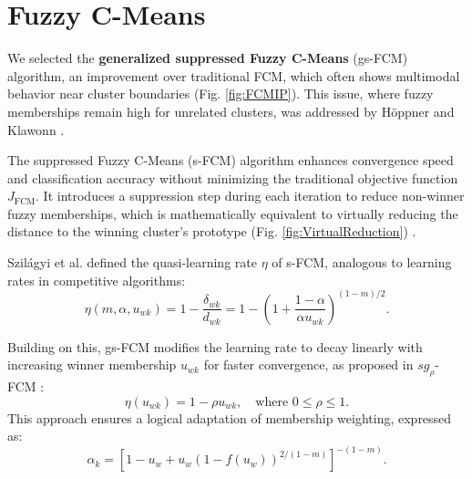 
\section{Fuzzy C-Means}

We selected the \textbf{generalized suppressed Fuzzy C-Means} (gs-FCM) algorithm, an improvement over traditional FCM, which often shows multimodal behavior near cluster boundaries (Fig. \ref{fig:FCMIP}). This issue, where fuzzy memberships remain high for unrelated clusters, was addressed by Höppner and Klawonn \cite{Hoppner2003}.

The suppressed Fuzzy C-Means (s-FCM) algorithm \cite{Fan2003} enhances convergence speed and classification accuracy without minimizing the traditional objective function \( J_{\text{FCM}} \). It introduces a suppression step during each iteration to reduce non-winner fuzzy memberships, which is mathematically equivalent to virtually reducing the distance to the winning cluster's prototype (Fig. \ref{fig:VirtualReduction}) \cite{Szilagyi2010}.

Szilágyi et al. \cite{Szilagyi2010} defined the quasi-learning rate \(\eta\) of s-FCM, analogous to learning rates in competitive algorithms:
\[
\eta(m, \alpha, u_{wk}) = 1 - \frac{\delta_{wk}}{d_{wk}} = 1 - \left( 1 + \frac{1-\alpha}{\alpha u_{wk}} \right)^{(1-m)/2}.
\]

Building on this, gs-FCM modifies the learning rate to decay linearly with increasing winner membership \(u_{wk}\) for faster convergence, as proposed in $sg_\rho$-FCM \cite{Szilagyi2014}:
\[
\eta(u_{wk}) = 1 - \rho u_{wk}, \quad \text{where } 0 \leq \rho \leq 1.
\]
This approach ensures a logical adaptation of membership weighting, expressed as:
\[
\alpha_k = \left[ 1 - u_w + u_w \left( 1 - f(u_w) \right)^{2/(1-m)} \right]^{-(1-m)}.
\]

